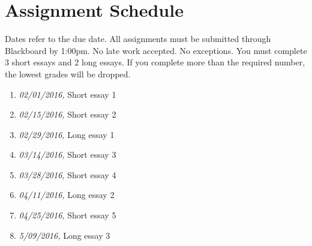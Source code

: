 \documentclass[article,oneside]{memoir}
\begin{document}
\section{ Assignment Schedule}

Dates refer to the due date. All assignments must be submitted through Blackboard by 1:00pm. No late work accepted. No exceptions. You must complete 3 short essays and 2 long essays. If you complete more than the required number, the lowest grades will be dropped.  
\begin{enumerate}
\item \textit{02/01/2016,} Short essay 1
\item \textit{02/15/2016,} Short essay 2
\item \textit{02/29/2016,} Long essay 1
\item \textit{03/14/2016,} Short essay 3
\item \textit{03/28/2016,} Short essay 4
\item \textit{04/11/2016,} Long essay 2
\item \textit{04/25/2016,} Short essay 5
\item \textit{5/09/2016,} Long essay 3
\end{enumerate}



\end{document}
